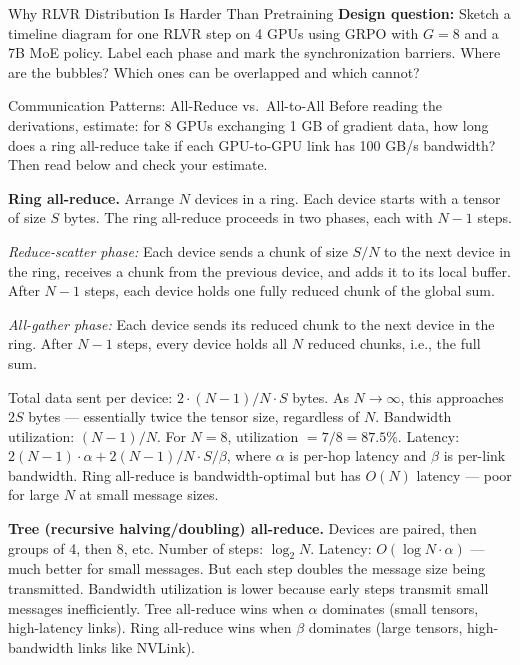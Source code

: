 \begin{thinkfirst}{Why RLVR Distribution Is Harder Than Pretraining}
\medskip
\textbf{Design question:} Sketch a timeline diagram for one RLVR step on 4 GPUs using GRPO with
$G=8$ and a 7B MoE policy.
Label each phase and mark the synchronization barriers.
Where are the bubbles?
Which ones can be overlapped and which cannot?
\end{thinkfirst}

\begin{thinkfirst}{Communication Patterns: All-Reduce vs.\ All-to-All}
Before reading the derivations, estimate: for 8 GPUs exchanging 1 GB of gradient data,
how long does a ring all-reduce take if each GPU-to-GPU link has 100 GB/s bandwidth?
Then read below and check your estimate.

\medskip
\textbf{Ring all-reduce.}
Arrange $N$ devices in a ring.
Each device starts with a tensor of size $S$ bytes.
The ring all-reduce proceeds in two phases, each with $N-1$ steps.

\emph{Reduce-scatter phase:} Each device sends a chunk of size $S/N$ to the next device in the ring,
receives a chunk from the previous device, and adds it to its local buffer.
After $N-1$ steps, each device holds one fully reduced chunk of the global sum.

\emph{All-gather phase:} Each device sends its reduced chunk to the next device in the ring.
After $N-1$ steps, every device holds all $N$ reduced chunks, i.e., the full sum.

Total data sent per device: $2 \cdot (N-1)/N \cdot S$ bytes.
As $N \to \infty$, this approaches $2S$ bytes --- essentially twice the tensor size, regardless of $N$.
Bandwidth utilization: $(N-1)/N$.
For $N=8$, utilization $= 7/8 = 87.5\%$.
Latency: $2(N-1) \cdot \alpha + 2(N-1)/N \cdot S / \beta$,
where $\alpha$ is per-hop latency and $\beta$ is per-link bandwidth.
Ring all-reduce is bandwidth-optimal but has $O(N)$ latency --- poor for large $N$ at small message sizes.

\medskip
\textbf{Tree (recursive halving/doubling) all-reduce.}
Devices are paired, then groups of 4, then 8, etc.
Number of steps: $\log_2 N$.
Latency: $O(\log N \cdot \alpha)$ --- much better for small messages.
But each step doubles the message size being transmitted.
Bandwidth utilization is lower because early steps transmit small messages inefficiently.
Tree all-reduce wins when $\alpha$ dominates (small tensors, high-latency links).
Ring all-reduce wins when $\beta$ dominates (large tensors, high-bandwidth links like NVLink).


\end{thinkfirst}
